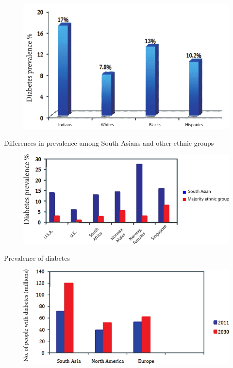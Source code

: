 \begin{figure}
\includegraphics{images/031.jpg}
\end{figure}

Differences in prevalence among South Asians and other ethnic groups

\begin{figure}
\includegraphics{images/032.jpg}
\end{figure}

\begin{center}
Prevalence of diabetes
\end{center}


\begin{figure}
\includegraphics{images/033.jpg}
\end{figure}

